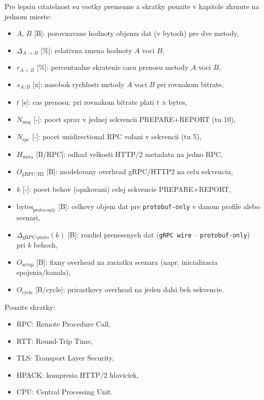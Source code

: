 \documentclass[12pt,a4paper]{report}
\begin{document}
Pre lepsiu citatelnost su vsetky premenne a skratky pouzite v kapitole
zhrnute na jednom mieste:
\begin{itemize}
  \item $A$, $B$ [B]: porovnavane hodnoty objemu dat (v bytoch) pre dve metody,
  \item $\Delta_{A \rightarrow B}$ [\%]: relativna zmena hodnoty $A$ voci $B$,
  \item $r_{A<B}$ [\%]: percentualne skratenie casu prenosu metody $A$ voci $B$,
  \item $s_{A/B}$ [x]: nasobok rychlosti metody $A$ voci $B$ pri rovnakom bitrate,
  \item $t$ [s]: cas prenosu; pri rovnakom bitrate plati $t \propto \text{bytes}$,
  \item $N_{\text{msg}}$ [-]: pocet sprav v jednej sekvencii PREPARE+REPORT (tu 10),
  \item $N_{\text{rpc}}$ [-]: pocet unidirectional RPC volani v sekvencii (tu 5),
  \item $H_{\text{meta}}$ [B/RPC]: odhad velkosti HTTP/2 metadata na jedno RPC,
  \item $O_{\text{gRPC/H2}}$ [B]: modelovany overhead gRPC/HTTP2 na celu sekvenciu,
  \item $k$ [-]: pocet behov (opakovani) celej sekvencie PREPARE+REPORT,
  \item $\text{bytes}_{\text{proto-only}}$ [B]: celkovy objem dat
  pre \texttt{protobuf-only} v danom profile alebo scenari,
  \item $\Delta_{\text{gRPC-proto}}(k)$ [B]: rozdiel prenesenych dat
  (\texttt{gRPC wire} -- \texttt{protobuf-only}) pri $k$ behoch,
  \item $O_{\text{setup}}$ [B]: fixny overhead na zaciatku scenara
  (napr. inicializacia spojenia/kanala),
  \item $O_{\text{cycle}}$ [B/cycle]: prirastkovy overhead na jeden dalsi beh sekvencie.
\end{itemize}

Pouzite skratky:
\begin{itemize}
  \item RPC: Remote Procedure Call,
  \item RTT: Round-Trip Time,
  \item TLS: Transport Layer Security,
  \item HPACK: kompresia HTTP/2 hlaviciek,
  \item CPU: Central Processing Unit.
\end{itemize}
\end{document}

